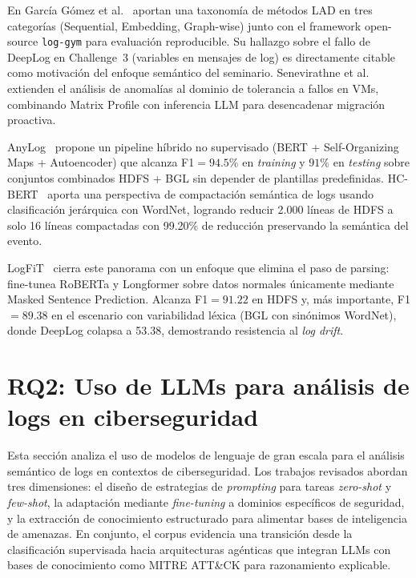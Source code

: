 En García Gómez et al.~\cite{garcia2026collaborative} aportan una taxonomía
de métodos LAD en tres categorías (Sequential, Embedding, Graph-wise)
junto con el framework open-source \texttt{log-gym} para evaluación
reproducible. Su hallazgo sobre el fallo de DeepLog en Challenge~3
(variables en mensajes de log) es directamente citable como motivación
del enfoque semántico del seminario. Senevirathne et al.~\cite{senevirathne2024vm}
extienden el análisis de anomalías al dominio de tolerancia a fallos
en VMs, combinando Matrix Profile con inferencia LLM para desencadenar
migración proactiva.

AnyLog~\cite{aziz2024deeplog} propone un pipeline híbrido no supervisado
(BERT + Self-Organizing Maps + Autoencoder) que alcanza F1$=94.5\%$
en \textit{training} y $91\%$ en \textit{testing} sobre conjuntos combinados HDFS + BGL
sin depender de plantillas predefinidas. HC-BERT~\cite{corbelle2024semantic}
aporta una perspectiva de compactación semántica de logs usando
clasificación jerárquica con WordNet, logrando reducir 2.000 líneas de
HDFS a solo 16 líneas compactadas con 99.20\% de reducción preservando
la semántica del evento.

LogFiT~\cite{almodovar2024logfit} cierra este panorama con un enfoque
que elimina el paso de parsing: fine-tunea RoBERTa y Longformer sobre
datos normales únicamente mediante Masked Sentence Prediction. Alcanza
F1$=91.22$ en HDFS y, más importante, F1$=89.38$ en el escenario con
variabilidad léxica (BGL con sinónimos WordNet), donde DeepLog colapsa
a 53.38, demostrando resistencia al \textit{log drift}.

\section{RQ2: Uso de LLMs para análisis de logs en ciberseguridad}

Esta sección analiza el uso de modelos de lenguaje de gran escala
para el análisis semántico de logs en contextos de ciberseguridad.
Los trabajos revisados abordan tres dimensiones: el diseño de
estrategias de \textit{prompting }para tareas \textit{zero-shot} y \textit{few-shot}, la
adaptación mediante \textit{fine-tuning} a dominios específicos de seguridad,
y la extracción de conocimiento estructurado para alimentar bases de
inteligencia de amenazas. En conjunto, el corpus evidencia una
transición desde la clasificación supervisada hacia arquitecturas
agénticas que integran LLMs con bases de conocimiento como MITRE
ATT\&CK para razonamiento explicable.

